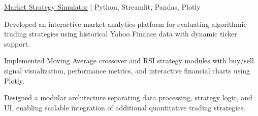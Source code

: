\begin{cvproject}{\href{https://github.com/grvsnh/market-strategy-simulator}{Market Strategy Simulator} | Python, Streamlit, Pandas, Plotly}{}
    \item Developed an interactive market analytics platform for evaluating algorithmic trading strategies using historical Yahoo Finance data with dynamic ticker support.
    \item Implemented Moving Average crossover and RSI strategy modules with buy/sell signal visualization, performance metrics, and interactive financial charts using Plotly.
    \item Designed a modular architecture separating data processing, strategy logic, and UI, enabling scalable integration of additional quantitative trading strategies.
\end{cvproject}
